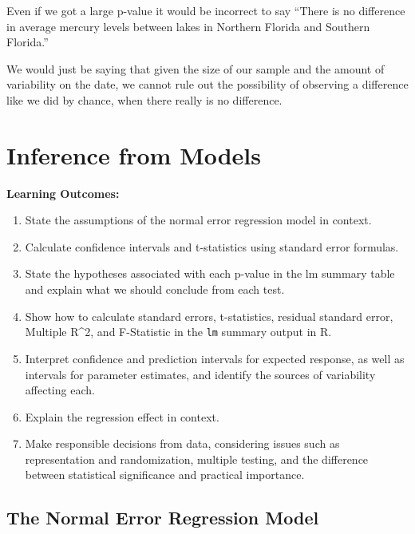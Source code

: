 \documentclass[
  letterpaper,
  DIV=11,
  numbers=noendperiod]{scrreprt}
\providecommand{\tightlist}{%
  \setlength{\itemsep}{0pt}\setlength{\parskip}{0pt}}\usepackage{longtable,booktabs,array}
\begin{document}
Even if we got a large p-value it would be incorrect to say ``There is
no difference in average mercury levels between lakes in Northern
Florida and Southern Florida.''

We would just be saying that given the size of our sample and the amount
of variability on the date, we cannot rule out the possibility of
observing a difference like we did by chance, when there really is no
difference.


\chapter{Inference from Models}\label{inference-from-models}

\textbf{Learning Outcomes:}

\begin{enumerate}
\def\labelenumi{\arabic{enumi}.}
\setcounter{enumi}{23}
\tightlist
\item
  State the assumptions of the normal error regression model in
  context.\\
\item
  Calculate confidence intervals and t-statistics using standard error
  formulas.\\
\item
  State the hypotheses associated with each p-value in the lm summary
  table and explain what we should conclude from each test.\\
\item
  Show how to calculate standard errors, t-statistics, residual standard
  error, Multiple R\^{}2, and F-Statistic in the \texttt{lm} summary
  output in R.\\
\item
  Interpret confidence and prediction intervals for expected response,
  as well as intervals for parameter estimates, and identify the sources
  of variability affecting each.
\item
  Explain the regression effect in context.\\
\item
  Make responsible decisions from data, considering issues such as
  representation and randomization, multiple testing, and the difference
  between statistical significance and practical importance.
\end{enumerate}

\section{The Normal Error Regression
Model}\label{the-normal-error-regression-model}
\end{document}
